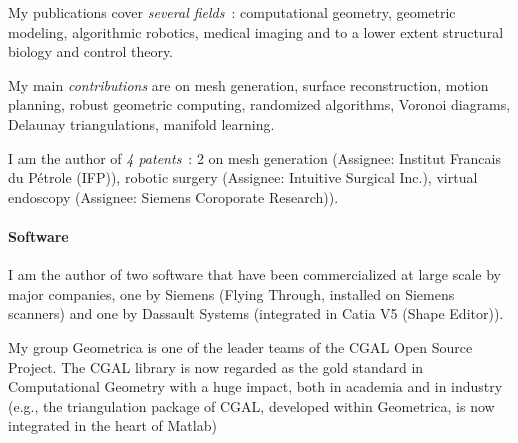 My publications cover {\em several fields}~: computational geometry, geometric modeling, algorithmic robotics, medical imaging and to a lower extent structural biology and control theory.

My main {\em contributions} are on  mesh generation, surface reconstruction, motion planning, robust geometric computing, randomized algorithms, Voronoi diagrams, Delaunay triangulations, manifold learning.

I am the author of {\em 4 patents}~: 2 on mesh generation (Assignee: Institut Francais du P\'etrole (IFP)), robotic surgery (Assignee: Intuitive Surgical Inc.), virtual endoscopy (Assignee: Siemens Coroporate Research)).

\paragraph{Software} \mbox{}

I am the author of two software that have been commercialized at large scale by major companies, one by Siemens (Flying Through, installed on Siemens scanners) and one by Dassault Systems (integrated in Catia V5 (Shape Editor)). 

My group Geometrica is one of the leader teams of  the CGAL Open Source Project.  The CGAL library  is now regarded as the gold standard in Computational Geometry with a huge impact, both in academia and in industry (e.g., the triangulation package of CGAL, developed within Geometrica, is now integrated in the heart of Matlab)










